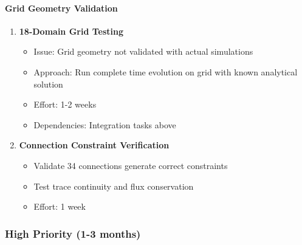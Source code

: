 \paragraph{Grid Geometry Validation}
\begin{enumerate}
    \item \textbf{18-Domain Grid Testing}
    \begin{itemize}
        \item Issue: Grid geometry not validated with actual simulations
        \item Approach: Run complete time evolution on grid with known analytical solution
        \item Effort: 1-2 weeks
        \item Dependencies: Integration tasks above
    \end{itemize}
    
    \item \textbf{Connection Constraint Verification}
    \begin{itemize}
        \item Validate 34 connections generate correct constraints
        \item Test trace continuity and flux conservation
        \item Effort: 1 week
    \end{itemize}
\end{enumerate}

\subsubsection{High Priority (1-3 months)}

